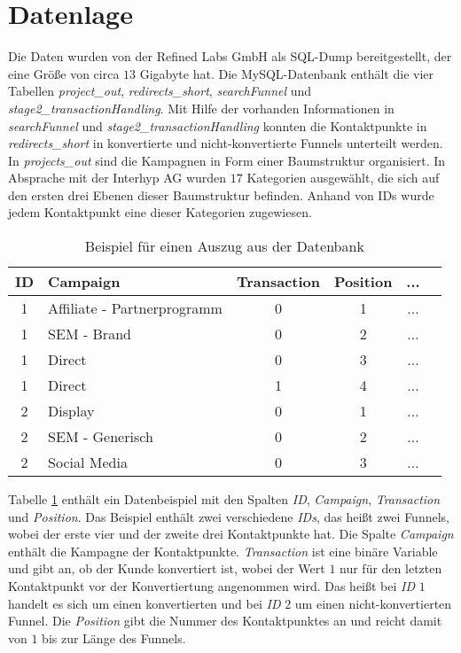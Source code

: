 \section{Datenlage}\label{datenlage}

Die Daten wurden von der Refined Labs GmbH als SQL-Dump bereitgestellt, der eine Größe von circa $13$ Gigabyte hat. Die MySQL-Datenbank enthält die vier Tabellen \textit{project\_out}, \textit{redirects\_short}, \textit{searchFunnel} und \textit{stage2\_transactionHandling}. Mit Hilfe der vorhanden Informationen in \textit{searchFunnel} und \textit{stage2\_transactionHandling} konnten die Kontaktpunkte in \textit{redirects\_short} in konvertierte und nicht-konvertierte Funnels unterteilt werden. In \textit{projects\_out} sind die Kampagnen in Form einer Baumstruktur organisiert. In Absprache mit der Interhyp AG wurden $17$ Kategorien ausgewählt, die sich auf den ersten drei Ebenen dieser Baumstruktur befinden. Anhand von IDs wurde jedem Kontaktpunkt eine dieser Kategorien zugewiesen.\\
\begin{table}[H]
	\begin{center}
		\begin{tabular}{|c|l|c|c|c|c|}
			\hline
			ID & Campaign 									 & Transaction & Position & ... \\ \hline\hline
			1  & Affiliate - Partnerprogramm & 0					 & 1		    & ... \\ \hline
			1  & SEM - Brand                 & 0					 & 2		    & ... \\ \hline
			1  & Direct                      & 0					 & 3		    & ... \\ \hline
			1  & Direct                      & 1					 & 4		    & ... \\ \hline
			2  & Display                     & 0					 & 1		    & ... \\ \hline
			2  & SEM - Generisch             & 0					 & 2		    & ... \\ \hline
			2  & Social Media                & 0					 & 3		    & ... \\ \hline
		\end{tabular} 
	\end{center}
	\caption{Beispiel für einen Auszug aus der Datenbank}\label{exdata}
\end{table}
\noindent Tabelle \ref{exdata} enthält ein Datenbeispiel mit den Spalten \textit{ID}, \textit{Campaign}, \textit{Transaction} und \textit{Position}. Das Beispiel enthält zwei verschiedene \textit{IDs}, das heißt zwei Funnels, wobei der erste vier und der zweite drei Kontaktpunkte hat. Die Spalte \textit{Campaign} enthält die Kampagne der Kontaktpunkte. \textit{Transaction} ist eine binäre Variable und gibt an, ob der Kunde konvertiert ist, wobei der Wert $1$ nur für den letzten Kontaktpunkt vor der Konvertiertung angenommen wird. Das heißt bei \textit{ID} $1$ handelt es sich um einen konvertierten und bei \textit{ID} $2$ um einen nicht-konvertierten Funnel. Die \textit{Position} gibt die Nummer des Kontaktpunktes an und reicht damit von $1$ bis zur Länge des Funnels.\\
